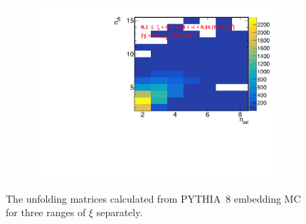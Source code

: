 \begin{figure}[h!]
\begin{subfigure}{.49\textwidth}
		\includegraphics[width=\textwidth,page=1]{chapters/chrgSTAR/img/unfolding/matrix_2.pdf}
	\end{subfigure}
	\begin{minipage}{.49\textwidth}
		\caption{The unfolding matrices calculated  from PYTHIA~8 embedding MC for three ranges of $\xi$ separately.}
		\label{fig:responseSTAR}
	\end{minipage}
	\vspace{-0.5cm}
\end{figure}


